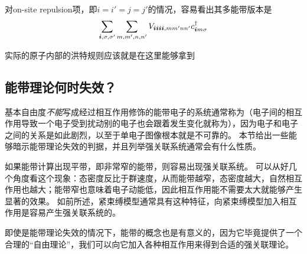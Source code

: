 对on-site repulsion项，即$i=i'=j=j'$的情况，容易看出其多能带版本是
\[
    \sum_{\vb*{i}, \sigma, \sigma'} \sum_{m, m', n, n'} V_{\vb*{i} \vb*{i} \vb*{i} \vb*{i},mm' nn'} c^\dagger_{\vb*{i} m \sigma} 
\]

实际的原子内部的洪特规则应该就是在这里能够拿到

\subsection{能带理论何时失效？}

基本自由度\emph{不能}写成经过相互作用修饰的能带电子的系统通常称为（电子间的相互作用导致一个电子受到扰动别的电子也会跟着发生变化就称为），因为电子和电子之间的关系是如此剧烈，以至于单电子图像根本就是不可靠的。
本节给出一些能够暗示能带理论失效的判据，并且列举强关联系统通常会有什么性质。

如果能带计算出现平带，即非常窄的能带，则容易出现强关联系统。
可以从好几个角度看这个现象：态密度反比于群速度，从而能带越窄，态密度越大，自然相互作用也越大；能带窄也意味着电子动能低，因此相互作用能不需要太大就能够产生显著的效果。
如前所述，紧束缚模型通常具有这种特征，向紧束缚模型加入相互作用是容易产生强关联系统的。

即使是能带理论失效的情况下，能带的概念也是有意义的，因为它毕竟提供了一个合理的“自由理论”，我们可以向它加入各种相互作用来得到合适的强关联理论。